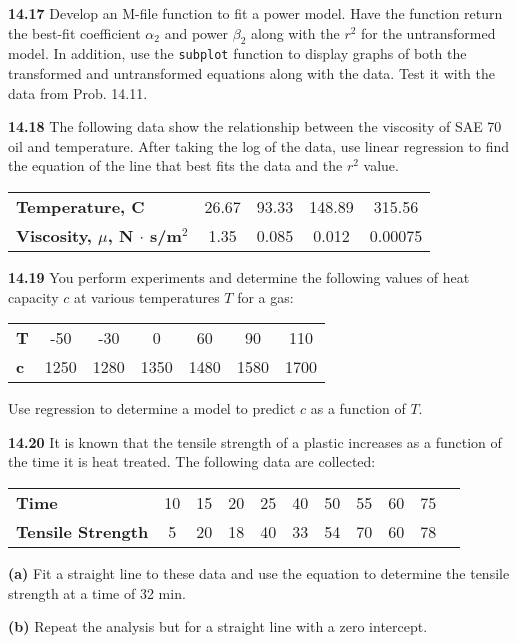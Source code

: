 \documentclass[../main.tex]{subfiles}
\begin{document}
\begin{multicols}{2}
	\noindent\textbf{14.17} Develop an M-file function to fit a power model.
	Have the function return the best-fit coefficient $\alpha_2$ and
	power $\beta_2$ along with the $r^2$ for the untransformed model. In
	addition, use the \texttt{subplot} function to display graphs of both
	the transformed and untransformed equations along with the
	data. Test it with the data from Prob. 14.11.

	\noindent\textbf{14.18} The following data show the relationship between the
	viscosity of SAE 70 oil and temperature. After taking the log
	of the data, use linear regression to find the equation of the
	line that best fits the data and the $r^2$ value.

	\noindent \begin{tabular}{l c c c c}
		\textbf{Temperature, \textdegree C} & 26.67 & 93.33 & 148.89 & 315.56 \\
		\textbf{Viscosity, $\mu$, N $\cdot$ s/m$^2$} & 1.35 & 0.085 & 0.012 & 0.00075
  	\end{tabular}

	\noindent\textbf{14.19} You perform experiments and determine the following values of heat capacity $c$ at various temperatures $T$ for a gas:

	\noindent \begin{tabular}{l c c c c c c}
		\textbf{T} & -50 & -30 & 0 & 60 & 90 & 110 \\
		\textbf{c} & 1250 & 1280 & 1350 & 1480 & 1580 & 1700
  	\end{tabular}

	\noindent Use regression to determine a model to predict $c$ as a function of $T$.

	\noindent\textbf{14.20} It is known that the tensile strength of a plastic increases as a function of the time it is heat treated. The following data are collected:

	\noindent \begin{tabular}{l c c c c c c c c c c}
		\textbf{Time} & 10 & 15 & 20 & 25 & 40 & 50 & 55 & 60 & 75 \\
		\textbf{Tensile Strength} & 5 & 20 & 18 & 40 & 33 & 54 & 70 & 60 & 78
  	\end{tabular}

	\noindent \textbf{(a)} Fit a straight line to these data and use the equation to
	determine the tensile strength at a time of 32 min.


	\noindent \textbf{(b)} Repeat the analysis but for a straight line with a zero
	intercept.


\end{multicols}
\end{document}
